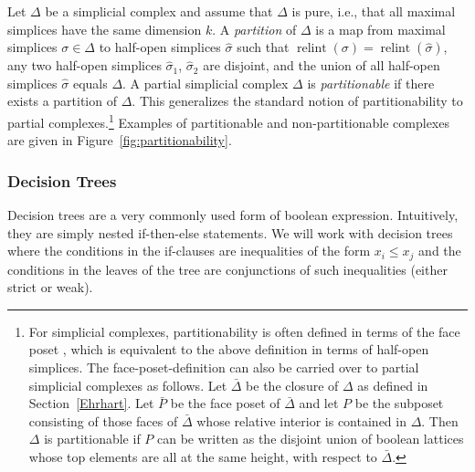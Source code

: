 \documentclass[12pt,reqno]{amsart}
\numberwithin{definition}{section}
\theoremstyle{definition}
\newcommand{\relint}{\operatorname{relint}}
\begin{document}
Let $\Delta$ be a simplicial complex and assume that $\Delta$ is pure, i.e., that all maximal simplices have the same dimension $k$. A \emph{partition} of $\Delta$ is a map from maximal simplices $\sigma\in\Delta$ to half-open simplices $\hat{\sigma}$ such that $\relint(\sigma)=\relint(\hat{\sigma})$, any two half-open simplices $\hat{\sigma}_1$, $\hat{\sigma}_2$ are disjoint, and the union of all half-open simplices $\hat{\sigma}$ equals $\Delta$. A partial simplicial complex $\Delta$ is \emph{partitionable} if there exists a partition of $\Delta$. This generalizes the standard notion of partitionability to partial complexes.\footnote{For simplicial complexes, partitionability is often defined in terms of the face poset \cite{Lee2004,Ziegler1995}, which is equivalent to the above definition in terms of half-open simplices. The face-poset-definition can also be carried over to partial simplicial complexes as follows. Let $\bar{\Delta}$ be the closure of $\Delta$ as defined in Section~\ref{Ehrhart}. Let $\bar{P}$ be the face poset of $\bar{\Delta}$ and let $P$ be the subposet consisting of those faces of $\bar{\Delta}$ whose relative interior is contained in $\Delta$. Then $\Delta$ is partitionable if $P$ can be written as the disjoint union of boolean lattices whose top elements are all at the same height, with respect to $\bar{\Delta}$.} Examples of partitionable and non-partitionable complexes are given in Figure~\ref{fig:partitionability}.

\subsubsection{Decision Trees} Decision trees are a very commonly used form of boolean expression. Intuitively, they are simply nested if-then-else statements. We will work with decision trees where the conditions in the if-clauses are inequalities of the form $x_i \leq x_j$ and the conditions in the leaves of the tree are conjunctions of such inequalities (either strict or weak).
\end{document}
